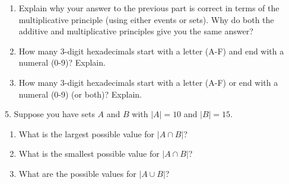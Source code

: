 \documentclass[10pt,]{book}
\theoremstyle{plain}
\theoremstyle{definition}
\numberwithin{equation}{chapter}
\newcommand{\card}[1]{\left| #1 \right|}
\begin{document}
\begin{exerciselist}
\begin{enumerate}[label=(\alph*)]
\item\hypertarget{li-193}{}
              Explain why your answer to the previous part is correct in terms of the multiplicative principle (using either events or sets). Why do both the additive and multiplicative principles give you the same answer?


\item\hypertarget{li-194}{}
              How many 3-digit hexadecimals start with a letter (A-F) and end with a numeral (0-9)? Explain.


\item\hypertarget{li-195}{}
              How many 3-digit hexadecimals start with a letter (A-F) or end with a numeral (0-9) (or both)? Explain.


\end{enumerate}

\par\smallskip
\item[5.]\hypertarget{exercise-47}{}
          Suppose you have sets \(A\) and \(B\) with \(\card{A} = 10\) and \(\card{B} = 15\).
          \leavevmode%
\begin{enumerate}[label=(\alph*)]
\item\hypertarget{li-196}{}What is the largest possible value for \(\card{A \cap B}\)?%
\item\hypertarget{li-197}{} What is the smallest possible value for \(\card{A \cap B}\)?%
\item\hypertarget{li-198}{} What are the possible values for \(\card{A \cup B}\)?%
\end{enumerate}


\end{exerciselist}
\end{document}
